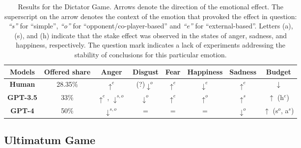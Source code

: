 \documentclass{article}
\begin{document}
\begin{table}[htbp]
\centering

\begin{tabular}{|c|c|c|c|c|c|c|c|}
\hline
\textbf{Models} & \textbf{Offered share} & \textbf{Anger} & \textbf{Disgust} & \textbf{Fear}  & \textbf{Happiness} & \textbf{Sadness} & \textbf{Budget} \\ \hline
\textbf{Human} & 28.35\%                                                 & $\uparrow^e$       & (?)$\downarrow^o$                & $\uparrow^e$                                                  & $\downarrow^e$    & $\uparrow^e$      & $\downarrow$          \\ \hline
\textbf{GPT-3.5} & 33\%  & $\uparrow^e$, $\downarrow^{s,o}$   & $\downarrow^o$ & $\uparrow^e$  & $\uparrow^o$  & $\uparrow^s$ & $\uparrow$ (h$^e$)\\ \hline
\textbf{GPT-4} & 50\% & $\downarrow^{s,o}$ & = & = & = & $\downarrow^o$  & $\uparrow$ (s$^o$, a$^s$) \\ \hline
\end{tabular}
\caption{Results for the Dictator Game. Arrows denote the direction of the emotional effect. The superscript on the arrow denotes the context of the emotion that provoked the effect in question: \textit{``s''} for ``simple'', \textit{``o''} for ``opponent/co-player-based'' and \textit{``e''} for ``external-based''. Letters (a), (s), and (h) indicate that the stake effect was observed in the states of anger, sadness, and happiness, respectively. The question mark indicates a lack of experiments addressing the stability of conclusions for this particular emotion.}
\label{tab:dict_res}
\end{table}

\subsection{Ultimatum Game}

\end{document}
